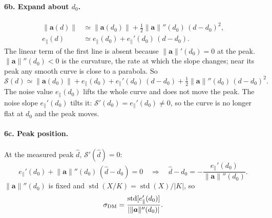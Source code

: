 \documentclass[11pt]{article}
\newcommand{\vb}[1]{\boldsymbol{#1}}
\newcommand{\nrm}[1]{\lVert #1\rVert}
\newcommand{\Sc}{\mathcal S}
\newcommand{\ep}{e_\parallel}
\newcommand{\std}{\operatorname{std}}
\begin{document}
\paragraph{6b. Expand about $d_0$.}
\begin{align}
\nrm{\vb a(d)}&\simeq\nrm{\vb a(d_0)}+\tfrac12\nrm{\vb a}''(d_0)\,(d-d_0)^{2},\\
\ep(d)&\simeq\ep(d_0)+\ep'(d_0)\,(d-d_0).
\end{align}
The linear term of the first line is absent because $\nrm{\vb a}'(d_0)=0$ at the peak. $\nrm{\vb a}''(d_0)<0$ is the
curvature, the rate at which the slope changes; near its peak any smooth curve is close to a parabola. So
\begin{equation}
\Sc(d)\simeq\nrm{\vb a(d_0)}+\ep(d_0)+\ep'(d_0)\,(d-d_0)+\tfrac12\nrm{\vb a}''(d_0)\,(d-d_0)^{2}.
\end{equation}
The noise value $\ep(d_0)$ lifts the whole curve and does not move the peak. The noise slope $\ep'(d_0)$ tilts
it: $\Sc'(d_0)=\ep'(d_0)\ne0$, so the curve is no longer flat at $d_0$ and the peak moves.

\paragraph{6c. Peak position.}
At the measured peak $\hat d$, $\Sc'(\hat d)=0$:
\begin{equation}
\ep'(d_0)+\nrm{\vb a}''(d_0)\,(\hat d-d_0)=0\quad\Rightarrow\quad \hat d-d_0=-\frac{\ep'(d_0)}{\nrm{\vb a}''(d_0)} .
\end{equation}
$\nrm{\vb a}''(d_0)$ is fixed and $\std(X/K)=\std(X)/|K|$, so
\begin{equation}
\sigma_{\rm DM}=\frac{\std[\ep'(d_0)]}{|\nrm{\vb a}''(d_0)|}.
\label{eq:sdm0}
\end{equation}
\end{document}
